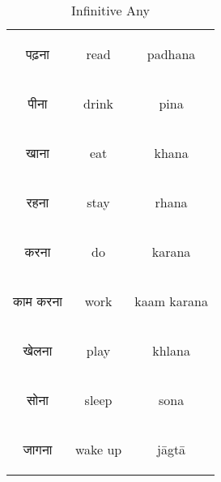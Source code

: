 \begin{table}[H]
    \centering
    \begin{tabular}{c|c|c}
        \begin{hindi} पढ़ना \end{hindi} & read &  padhana\\
        \begin{hindi} पीना \end{hindi} & drink &  pina \\
        \begin{hindi} खाना \end{hindi} & eat &  khana \\
        \begin{hindi} रहना \end{hindi} & stay &  rhana \\
        \begin{hindi} करना \end{hindi} & do &  karana \\
        \begin{hindi} काम करना  \end{hindi} & work &  kaam karana \\
        \begin{hindi} खेलना \end{hindi} & play &  khlana \\
        \begin{hindi} सोना \end{hindi} & sleep & sona \\
        \begin{hindi} जागना \end{hindi} & wake up & jāgtā \\
    \end{tabular}
    \caption{Infinitive Any}
    \label{tab:verbs_any}
\end{table}



